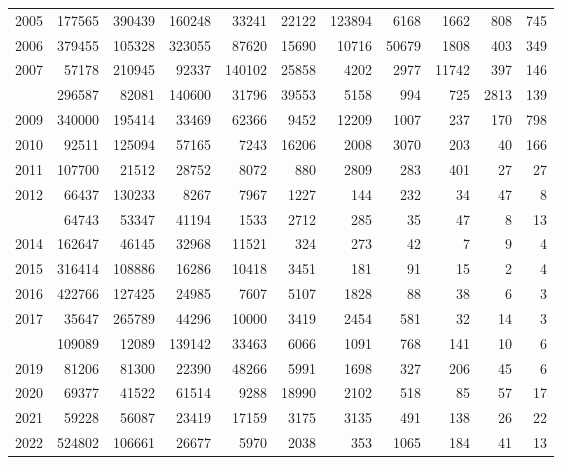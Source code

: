 \documentclass[
]{article}
\begin{document}
\begin{longtable}[t]{lrrrrrrrrrr}
2005 & 177565 & 390439 & 160248 & 33241 & 22122 & 123894 & 6168 & 1662 & 808 & 745\\
2006 & 379455 & 105328 & 323055 & 87620 & 15690 & 10716 & 50679 & 1808 & 403 & 349\\
2007 & 57178 & 210945 & 92337 & 140102 & 25858 & 4202 & 2977 & 11742 & 397 & 146\\
\addlinespace
2008 & 296587 & 82081 & 140600 & 31796 & 39553 & 5158 & 994 & 725 & 2813 & 139\\
2009 & 340000 & 195414 & 33469 & 62366 & 9452 & 12209 & 1007 & 237 & 170 & 798\\
2010 & 92511 & 125094 & 57165 & 7243 & 16206 & 2008 & 3070 & 203 & 40 & 166\\
2011 & 107700 & 21512 & 28752 & 8072 & 880 & 2809 & 283 & 401 & 27 & 27\\
2012 & 66437 & 130233 & 8267 & 7967 & 1227 & 144 & 232 & 34 & 47 & 8\\
\addlinespace
2013 & 64743 & 53347 & 41194 & 1533 & 2712 & 285 & 35 & 47 & 8 & 13\\
2014 & 162647 & 46145 & 32968 & 11521 & 324 & 273 & 42 & 7 & 9 & 4\\
2015 & 316414 & 108886 & 16286 & 10418 & 3451 & 181 & 91 & 15 & 2 & 4\\
2016 & 422766 & 127425 & 24985 & 7607 & 5107 & 1828 & 88 & 38 & 6 & 3\\
2017 & 35647 & 265789 & 44296 & 10000 & 3419 & 2454 & 581 & 32 & 14 & 3\\
\addlinespace
2018 & 109089 & 12089 & 139142 & 33463 & 6066 & 1091 & 768 & 141 & 10 & 6\\
2019 & 81206 & 81300 & 22390 & 48266 & 5991 & 1698 & 327 & 206 & 45 & 6\\
2020 & 69377 & 41522 & 61514 & 9288 & 18990 & 2102 & 518 & 85 & 57 & 17\\
2021 & 59228 & 56087 & 23419 & 17159 & 3175 & 3135 & 491 & 138 & 26 & 22\\
2022 & 524802 & 106661 & 26677 & 5970 & 2038 & 353 & 1065 & 184 & 41 & 13\\*
\end{longtable}
\end{document}

